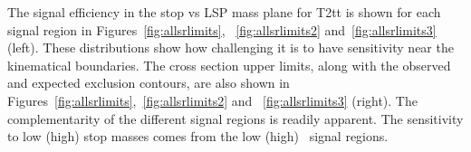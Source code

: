 
The signal efficiency in the stop vs LSP mass plane for T2tt is shown 
for each signal region in Figures~\ref{fig:allsrlimits},
~\ref{fig:allsrlimits2} and~\ref{fig:allsrlimits3} (left). These distributions show how
challenging it is to have sensitivity near the kinematical boundaries.
The cross section upper limits, along with the
observed and expected exclusion contours, are also shown in
Figures~\ref{fig:allsrlimits},~\ref{fig:allsrlimits2} and ~\ref{fig:allsrlimits3} (right).
The complementarity of the different signal regions is readily apparent.  
The sensitivity to low (high) stop masses comes from the 
low (high) \met\ signal regions.

